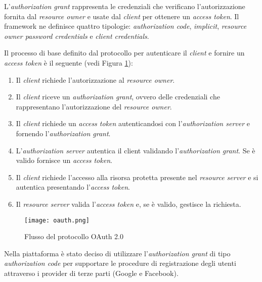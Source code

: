 L'\textit{authorization grant} rappresenta le credenziali che verificano l'autorizzazione fornita dal \textit{resource owner} e usate dal \textit{client} per ottenere un \textit{access token}.
Il framework ne definisce quattro tipologie: \textit{authorization code}, \textit{implicit}, \textit{resource owner password credentials} e \textit{client credentials}.

Il processo di base definito dal protocollo per autenticare il \textit{client} e fornire un \textit{access token} è il seguente (vedi Figura \ref{fig:OAuth2.0}):
\begin{enumerate}
    \itemsep0em
    \item Il \textit{client} richiede l'autorizzazione al \textit{resource owner}.
    \item Il \textit{client} riceve un \textit{authorization grant}, ovvero delle credenziali che rappresentano l'autorizzazione del \textit{resource owner}.
    \item Il \textit{client} richiede un \textit{access token} autenticandosi con l'\textit{authorization server} e fornendo l'\textit{authorization grant}.
    \item L'\textit{authorization server} autentica il client validando l'\textit{authorization grant}. Se è valido fornisce un \textit{access token}.
    \item Il \textit{client} richiede l'accesso alla risorsa protetta presente nel \textit{resource server} e si autentica presentando l'\textit{access token}.
    \item Il \textit{resource server} valida l'\textit{access token} e, se è valido, gestisce la richiesta.
\end{enumerate}

\begin{figure}[H]
    \centering
    \texttt{[image: oauth.png]}
    \caption{Flusso del protocollo OAuth 2.0}
    \label{fig:OAuth2.0}
\end{figure}

Nella piattaforma è stato deciso di utilizzare l'\textit{authorization grant} di tipo \textit{authorization code} per supportare le procedure
di registrazione degli utenti attraverso i provider di terze parti (Google e Facebook).

